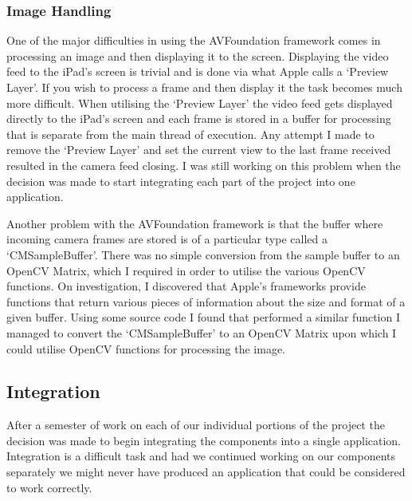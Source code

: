 \documentclass{article}
\begin{document}
\subsubsection{Image Handling}

One of the major difficulties in using the AVFoundation framework comes in processing an image and then displaying it to the screen. Displaying the video feed to the iPad's screen is trivial and is done via what Apple calls a `Preview Layer'. If you wish to process a frame and then display it the task becomes much more difficult. When utilising the `Preview Layer' the video feed gets displayed directly to the iPad's screen and each frame is stored in a buffer for processing that is separate from the main thread of execution. %
 Any attempt I made to remove the `Preview Layer' and set the current view to the last frame received resulted in the camera feed closing. 
 I was still working on this problem when the decision was made to start integrating each part of the project into one application.

Another problem with the AVFoundation framework is that the buffer where incoming camera frames are stored is of a particular type called a `CMSampleBuffer'. There was no simple conversion from the sample buffer to an OpenCV Matrix, which I required in order to utilise the various OpenCV functions. On investigation, I discovered that Apple's frameworks provide functions that return various pieces of information about the size and format of a given buffer. Using some source code I found that performed a similar function \cite{iOS} %
I managed to convert the `CMSampleBuffer' to an OpenCV Matrix upon which I could utilise OpenCV functions for processing the image.


\subsection{Integration}

After a semester of work on each of our individual portions of the project the decision was made to begin integrating the components into a single application. Integration is a difficult task and had we continued working on our components separately we might never have produced an application that could be considered to work correctly.
\end{document}
